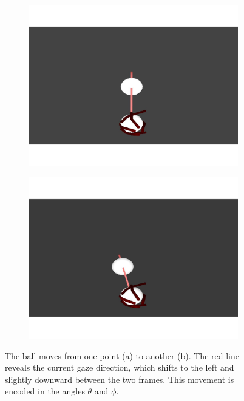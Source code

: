 \documentclass [MS] {UCLAthesis}
\begin{document}
\begin{figure}
     \centering
     \begin{subfigure}[b]{0.48\textwidth}
         \centering
         \includegraphics[width=\textwidth]{image000028}
         \caption{}
         \label{fig:ball_pos1}
     \end{subfigure}
     \hfill
     \begin{subfigure}[b]{0.48\textwidth}
         \centering
         \includegraphics[width=\textwidth]{image000068}
         \caption{}
         \label{fig:ball_pos2}
     \end{subfigure}
    \caption[Target movement and corresponding gaze correction]{The ball moves from one point (a) to another (b). The red line reveals the current gaze direction, which shifts to the left and slightly downward between the two frames. This movement is encoded in the angles $\theta$ and $\phi$.}
    \label{fig:ball_movement}
\end{figure}
\end{document}

